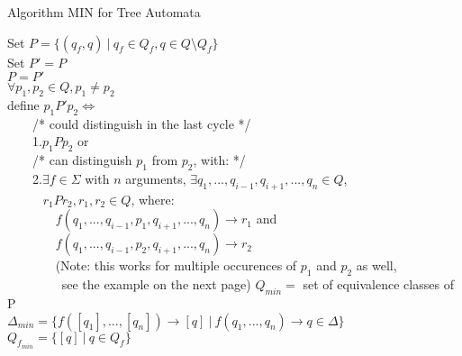 \documentclass{llncs}
\begin{document}
\begin{definition}{Algorithm MIN for Tree Automata} \cite{martens-uni-dortmund-lecture02}\\
	\begin{algorithm}[H]
		Set \(P = \{(q_f, q)~|~q_f \in Q_f, q \in Q \setminus Q_f\}\)\\
		Set \(P' = P\)\\
		 {
			\(P = P'\)\\
			\(\forall p_1, p_2 \in Q, p_1 \neq p_2\)\\
			define \(p_1P'p_2 \iff\)\\
			~~~~/* could distinguish in the last cycle */\\
			~~~~1.\(p_1Pp_2\) or\\
			~~~~/* can distinguish \(p_1\) from \(p_2\), with: */\\
			~~~~2.\(\exists f \in \Sigma\) with \(n\) arguments, \(\exists q_1, ..., q_{i-1}, q_{i+1}, ..., q_n \in Q\), \\
			~~~~~ \(r_1Pr_2, r_1, r_2 \in Q\), where: \\
			~~~~~~~ \(f(q_1, ..., q_{i-1}, p_1, q_{i+1}, ..., q_n) \rightarrow r_1\) and\\
			~~~~~~~ \(f(q_1, ..., q_{i-1}, p_2, q_{i+1}, ..., q_n) \rightarrow r_2\) \\
			~~~~~~~ (Note: this works for multiple occurences of \(p_1\) and \(p_2\) as well, \\
			~~~~~~~~ see the example on the next page)
		}
		\(Q_{min} = \) set of equivalence classes of P \\
		\(\Delta_{min} = \{f([q_1], ..., [q_n]) \rightarrow [q]~|~f(q_1, ..., q_n) \rightarrow q \in \Delta\}\)\\
		\(Q_{f_{min}} = \{[q]~|~q \in Q_f\}\)\\
	\end{algorithm}
\end{definition}

\pagebreak
\end{document}

